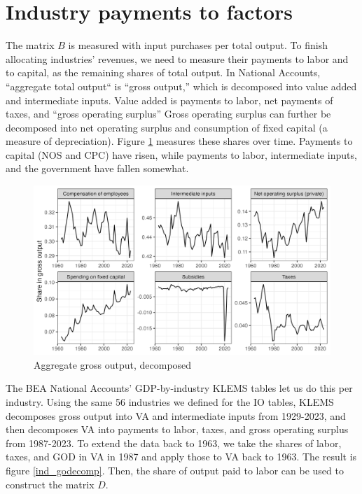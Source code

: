 \documentclass[12pt]{article}
\begin{document}
\section*{Industry payments to factors}
The matrix $B$ is measured with input purchases per total output. To finish allocating industries' revenues, we need to measure their payments to labor and to capital, as the remaining shares of total output. In National Accounts, ``aggregate total output`` is ``gross output,'' which is decomposed into value added and intermediate inputs. Value added is payments to labor, net payments of taxes, and ``gross operating surplus'' Gross operating surplus can further be decomposed into net operating surplus and consumption of fixed capital (a measure of depreciation). Figure \ref{godecomp} measures these shares over time. Payments to capital (NOS and CPC) have risen, while payments to labor, intermediate inputs, and the government have fallen somewhat.

\begin{figure}\centering\caption{Aggregate gross output, decomposed}\label{godecomp}
    \includegraphics[width=.7\textwidth]{../figures/exploration/IO-matrices/aggregate_GO decomposition.png}
\end{figure}

The BEA National Accounts' GDP-by-industry KLEMS tables let us do this per industry. Using the same 56 industries we defined for the IO tables, KLEMS decomposes gross output into VA and intermediate inputs from 1929-2023, and then decomposes VA into payments to labor, taxes, and gross operating surplus from 1987-2023. To extend the data back to 1963, we take the shares of labor, taxes, and GOD in VA in 1987 and apply those to VA back to 1963. The result is figure \ref{ind_godecomp}. Then, the share of output paid to labor can be used to construct the matrix $D$.
\end{document}
